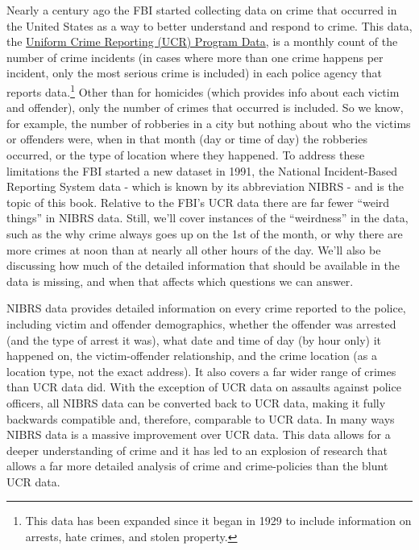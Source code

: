 \documentclass[
  12pt,
  openany]{book}
\begin{document}
Nearly a century ago the FBI started collecting data on crime that occurred in the United States as a way to better understand and respond to crime. This data, the \href{https://ucrbook.com/}{Uniform Crime Reporting (UCR) Program Data}, is a monthly count of the number of crime incidents (in cases where more than one crime happens per incident, only the most serious crime is included) in each police agency that reports data.\footnote{This data has been expanded since it began in 1929 to include information on arrests, hate crimes, and stolen property.} Other than for homicides (which provides info about each victim and offender), only the number of crimes that occurred is included. So we know, for example, the number of robberies in a city but nothing about who the victims or offenders were, when in that month (day or time of day) the robberies occurred, or the type of location where they happened. To address these limitations the FBI started a new dataset in 1991, the National Incident-Based Reporting System data - which is known by its abbreviation NIBRS - and is the topic of this book. Relative to the FBI's UCR data there are far fewer ``weird things'' in NIBRS data. Still, we'll cover instances of the ``weirdness'' in the data, such as the why crime always goes up on the 1st of the month, or why there are more crimes at noon than at nearly all other hours of the day. We'll also be discussing how much of the detailed information that should be available in the data is missing, and when that affects which questions we can answer.

NIBRS data provides detailed information on every crime reported to the police, including victim and offender demographics, whether the offender was arrested (and the type of arrest it was), what date and time of day (by hour only) it happened on, the victim-offender relationship, and the crime location (as a location type, not the exact address). It also covers a far wider range of crimes than UCR data did. With the exception of UCR data on assaults against police officers, all NIBRS data can be converted back to UCR data, making it fully backwards compatible and, therefore, comparable to UCR data. In many ways NIBRS data is a massive improvement over UCR data. This data allows for a deeper understanding of crime and it has led to an explosion of research that allows a far more detailed analysis of crime and crime-policies than the blunt UCR data.
\end{document}
